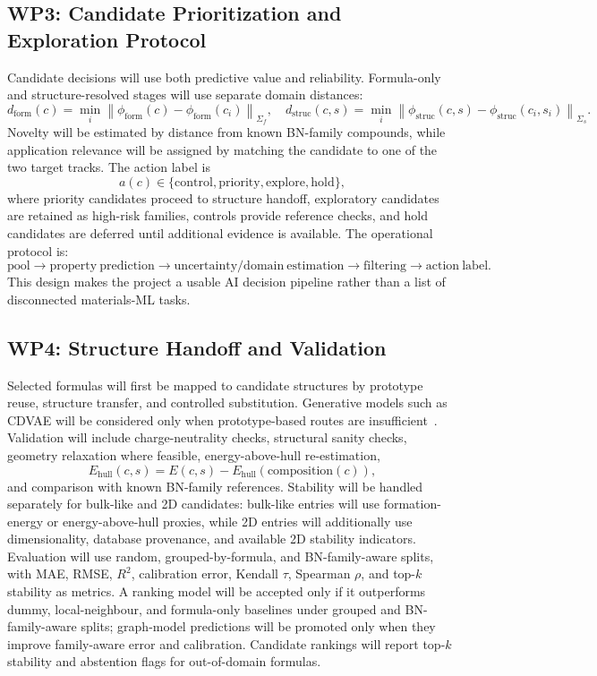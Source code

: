 \documentclass[10pt,a4paper]{article}
\newcommand{\ehull}{E_{\mathrm{hull}}}
\newcommand{\domainf}{d_{\mathrm{form}}}
\newcommand{\domains}{d_{\mathrm{struc}}}
\begin{document}
\subsection{WP3: Candidate Prioritization and Exploration Protocol}
Candidate decisions will use both predictive value and reliability. Formula-only and structure-resolved stages will use separate domain distances:
\[
  \domainf(c)=\min_i\left\|\phi_{\mathrm{form}}(c)-\phi_{\mathrm{form}}(c_i)\right\|_{\Sigma_f},
  \quad
  \domains(c,s)=\min_i\left\|\phi_{\mathrm{struc}}(c,s)-\phi_{\mathrm{struc}}(c_i,s_i)\right\|_{\Sigma_s}.
\]
Novelty will be estimated by distance from known BN-family compounds, while application relevance will be assigned by matching the candidate to one of the two target tracks. The action label is
\[
  a(c)\in\{\mathrm{control},\mathrm{priority},\mathrm{explore},\mathrm{hold}\},
\]
where priority candidates proceed to structure handoff, exploratory candidates are retained as high-risk families, controls provide reference checks, and hold candidates are deferred until additional evidence is available. The operational protocol is:
\[
  \mathrm{pool}\rightarrow\mathrm{property\ prediction}\rightarrow
  \mathrm{uncertainty/domain\ estimation}\rightarrow
  \mathrm{filtering}\rightarrow\mathrm{action\ label}.
\]
This design makes the project a usable AI decision pipeline rather than a list of disconnected materials-ML tasks.

\subsection{WP4: Structure Handoff and Validation}
Selected formulas will first be mapped to candidate structures by prototype reuse, structure transfer, and controlled substitution. Generative models such as CDVAE will be considered only when prototype-based routes are insufficient~\cite{xie2022_cdvae}. Validation will include charge-neutrality checks, structural sanity checks, geometry relaxation where feasible, energy-above-hull re-estimation,
\[
  \ehull(c,s)=E(c,s)-E_{\mathrm{hull}}(\mathrm{composition}(c)),
\]
and comparison with known BN-family references. Stability will be handled separately for bulk-like and 2D candidates: bulk-like entries will use formation-energy or energy-above-hull proxies, while 2D entries will additionally use dimensionality, database provenance, and available 2D stability indicators. Evaluation will use random, grouped-by-formula, and BN-family-aware splits, with MAE, RMSE, $R^2$, calibration error, Kendall $\tau$, Spearman $\rho$, and top-$k$ stability as metrics. A ranking model will be accepted only if it outperforms dummy, local-neighbour, and formula-only baselines under grouped and BN-family-aware splits; graph-model predictions will be promoted only when they improve family-aware error and calibration. Candidate rankings will report top-$k$ stability and abstention flags for out-of-domain formulas.
\end{document}
